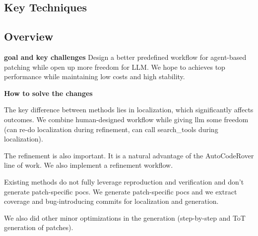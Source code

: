 

\subsection{Key Techniques}

\subsection{Overview}

\noindent\textbf{goal and key challenges} 
Design a better predefined workflow for agent-based patching while open up more freedom for LLM. We hope to achieves top performance while maintaining low costs and high stability.



\noindent\textbf{How to solve the changes}

The key difference between methods lies in localization, which significantly affects outcomes. We combine human-designed workflow while giving llm some freedom (can re-do localization during refinement, can call search\_tools during localization).

The refinement is also important. It is a natural advantage of the AutoCodeRover line of work. We also implement a refinement workflow.

Existing methods do not fully leverage reproduction and verification and don't generate patch-specific pocs. We generate patch-specific pocs and we extract coverage and bug-introducing commits for localization and generation.  

We also did other minor optimizations in the generation (step-by-step and ToT generation of patches).

